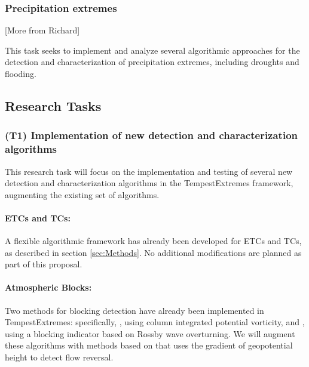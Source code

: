 \documentclass[11pt]{article}
\begin{document}
\subsubsection{Precipitation extremes}

{\color{red}[More from Richard]}

This task seeks to implement and analyze several algorithmic approaches for the detection and characterization of precipitation extremes, including droughts and flooding.

\subsection{Research Tasks}




\subsubsection{(T1) Implementation of new detection and characterization algorithms}

This research task will focus on the implementation and testing of several new detection and characterization algorithms in the TempestExtremes framework, augmenting the existing set of  algorithms.

\paragraph{ETCs and TCs:}  A flexible algorithmic framework has already been developed for ETCs and TCs, as described in section \ref{sec:Methods}.  No additional modifications are planned as part of this proposal.

\paragraph{Atmospheric Blocks:}  Two methods for blocking detection have already been implemented in TempestExtremes:  specifically, \cite{schwierz2004perspicacious}, using column integrated potential vorticity, and \cite{pelly2003new}, using a blocking indicator based on Rossby wave overturning.  We will augment these algorithms with methods based on \cite{tibaldi1990operational} that uses the gradient of geopotential height to detect flow reversal.
\end{document}
